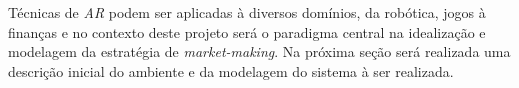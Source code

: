 Técnicas de \textit{AR} podem ser aplicadas à diversos domínios, da robótica, jogos à finanças e no contexto deste projeto será o paradigma central na idealização e modelagem da estratégia de \textit{market-making}. Na próxima seção será realizada uma descrição inicial do ambiente e da modelagem do sistema à ser realizada.
